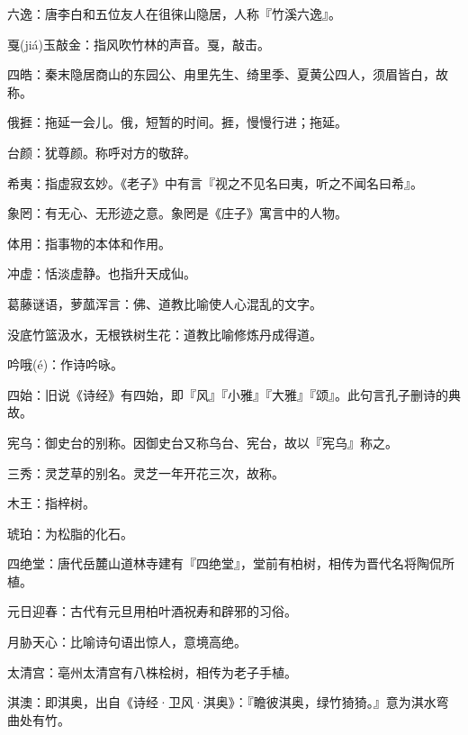 \startbuffer[1841]
六逸：唐李白和五位友人在徂徕山隐居，人称『竹溪六逸』。
\stopbuffer


\startbuffer[1842]
戛(jiá)玉敲金：指风吹竹林的声音。戛，敲击。
\stopbuffer


\startbuffer[1843]
四皓：秦末隐居商山的东园公、甪里先生、绮里季、夏黄公四人，须眉皆白，故称。
\stopbuffer


\startbuffer[1844]
俄捱：拖延一会儿。俄，短暂的时间。捱，慢慢行进；拖延。
\stopbuffer


\startbuffer[1845]
台颜：犹尊颜。称呼对方的敬辞。
\stopbuffer


\startbuffer[1846]
希夷：指虚寂玄妙。《老子》中有言『视之不见名曰夷，听之不闻名曰希』。
\stopbuffer


\startbuffer[1847]
象罔：有无心、无形迹之意。象罔是《庄子》寓言中的人物。
\stopbuffer


\startbuffer[1848]
体用：指事物的本体和作用。
\stopbuffer


\startbuffer[1849]
冲虚：恬淡虚静。也指升天成仙。
\stopbuffer


\startbuffer[1850]
葛藤谜语，萝蓏浑言：佛、道教比喻使人心混乱的文字。
\stopbuffer


\startbuffer[1851]
没底竹篮汲水，无根铁树生花：道教比喻修炼丹成得道。
\stopbuffer


\startbuffer[1852]
吟哦(é)：作诗吟咏。
\stopbuffer


\startbuffer[1853]
四始：旧说《诗经》有四始，即『风』『小雅』『大雅』『颂』。此句言孔子删诗的典故。
\stopbuffer


\startbuffer[1854]
宪乌：御史台的别称。因御史台又称乌台、宪台，故以『宪乌』称之。
\stopbuffer


\startbuffer[1855]
三秀：灵芝草的别名。灵芝一年开花三次，故称。
\stopbuffer


\startbuffer[1856]
木王：指梓树。
\stopbuffer


\startbuffer[1857]
琥珀：为松脂的化石。
\stopbuffer


\startbuffer[1858]
四绝堂：唐代岳麓山道林寺建有『四绝堂』，堂前有柏树，相传为晋代名将陶侃所植。
\stopbuffer


\startbuffer[1859]
元日迎春：古代有元旦用柏叶酒祝寿和辟邪的习俗。
\stopbuffer


\startbuffer[1860]
月胁天心：比喻诗句语出惊人，意境高绝。
\stopbuffer


\startbuffer[1861]
太清宫：亳州太清宫有八株桧树，相传为老子手植。
\stopbuffer


\startbuffer[1862]
淇澳：即淇奥，出自《诗经·卫风·淇奥》：『瞻彼淇奥，绿竹猗猗。』意为淇水弯曲处有竹。
\stopbuffer


